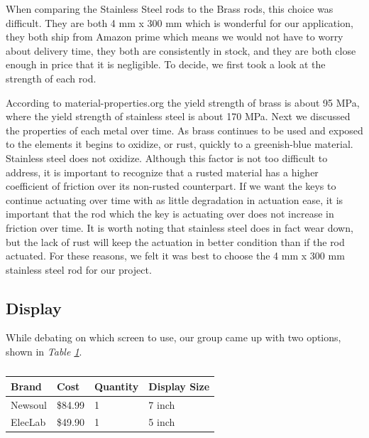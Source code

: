 When comparing the Stainless Steel rods to the Brass rods, this choice was difficult. They are both 4 mm x 300 mm which is wonderful for our application, they both ship from Amazon prime which means we would not have to worry about delivery time, they both are consistently in stock, and they are both close enough in price that it is negligible. To decide, we first took a look at the strength of each rod.

According to material-properties.org the yield strength of brass is about 95 MPa, where the yield strength of stainless steel is about 170 MPa. Next we discussed the properties of each metal over time. As brass continues to be used and exposed to the elements it begins to oxidize, or rust, quickly to a greenish-blue material. Stainless steel does not oxidize. Although this factor is not too difficult to address, it is important to recognize that a rusted material has a higher coefficient of friction over its non-rusted counterpart. If we want the keys to continue actuating over time with as little degradation in actuation ease, it is important that the rod which the key is actuating over does not increase in friction over time. It is worth noting that stainless steel does in fact wear down, but the lack of rust will keep the actuation in better condition than if the rod actuated. For these reasons, we felt it was best to choose the 4 mm x 300 mm stainless steel rod for our project.

\subsection{Display}

While debating on which screen to use, our group came up with two options, shown in \textit{Table \ref{Tab:display_brand}}.

\begin{table}[]
  \centering
  \begin{tabular}{|l|l|l|l|}
    \hline
    Brand   & Cost    & Quantity & Display Size \\ \hline
    Newsoul & \$84.99 & 1        & 7 inch       \\ \hline
    ElecLab & \$49.90 & 1        & 5 inch       \\ \hline
  \end{tabular}
  \caption{}
  \label{Tab:display_brand}
\end{table}

